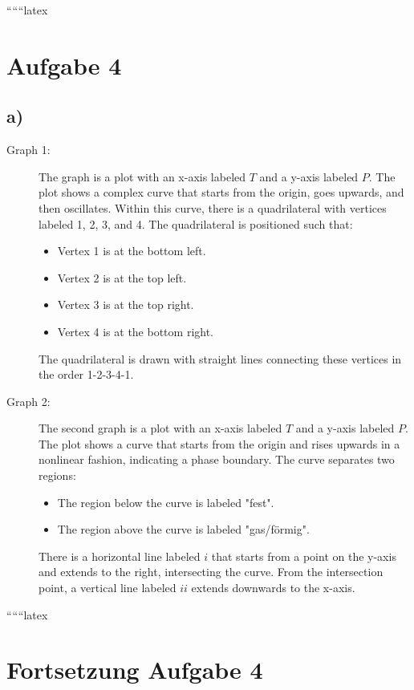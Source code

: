 
``````latex


\section*{Aufgabe 4}

\subsection*{a)}

\begin{description}
    \item[Graph 1:] 
    The graph is a plot with an x-axis labeled \( T \) and a y-axis labeled \( P \). The plot shows a complex curve that starts from the origin, goes upwards, and then oscillates. Within this curve, there is a quadrilateral with vertices labeled 1, 2, 3, and 4. The quadrilateral is positioned such that:
    \begin{itemize}
        \item Vertex 1 is at the bottom left.
        \item Vertex 2 is at the top left.
        \item Vertex 3 is at the top right.
        \item Vertex 4 is at the bottom right.
    \end{itemize}
    The quadrilateral is drawn with straight lines connecting these vertices in the order 1-2-3-4-1.
    
    \item[Graph 2:]
    The second graph is a plot with an x-axis labeled \( T \) and a y-axis labeled \( P \). The plot shows a curve that starts from the origin and rises upwards in a nonlinear fashion, indicating a phase boundary. The curve separates two regions:
    \begin{itemize}
        \item The region below the curve is labeled "fest".
        \item The region above the curve is labeled "gas/förmig".
    \end{itemize}
    There is a horizontal line labeled \( i \) that starts from a point on the y-axis and extends to the right, intersecting the curve. From the intersection point, a vertical line labeled \( ii \) extends downwards to the x-axis.
\end{description}

``````latex

\section*{Fortsetzung Aufgabe 4}

